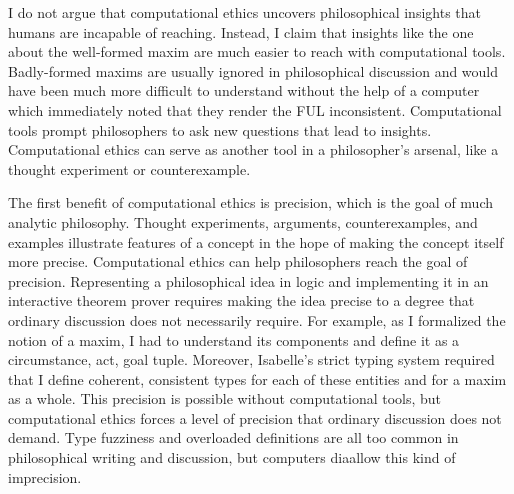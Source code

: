 \begin{isabellebody}
\begin{isamarkuptext}
I do not argue that computational ethics uncovers philosophical insights that humans are incapable 
of reaching. Instead, I claim that insights like the one about the well-formed maxim are much easier
to reach with computational tools. Badly-formed maxims are usually ignored in philosophical discussion 
and would have been much more difficult to understand without the help of a computer which immediately
noted that they render the FUL inconsistent. Computational tools prompt philosophers to ask new questions that 
lead to insights. Computational ethics can serve as another tool in a philosopher's arsenal, like a 
thought experiment or counterexample.

The first benefit of computational ethics is precision, which is the goal of much analytic
philosophy. Thought experiments, arguments, counterexamples, and examples 
illustrate features of a concept in the hope of making the concept itself more precise. Computational 
ethics can help philosophers reach the goal of precision. Representing a philosophical idea in logic 
and implementing it in an interactive theorem prover requires making the idea precise to a degree 
that ordinary discussion does not necessarily require. For example, as I formalized the notion of a 
maxim, I had to understand its components and define it as a circumstance, act, goal tuple. Moreover, 
Isabelle's strict typing system required that I define coherent, consistent types for each of these 
entities and for a maxim as a whole. This precision is possible without computational tools, but 
computational ethics forces a level of precision that ordinary discussion does not demand. Type 
fuzziness and overloaded definitions are all too common in philosophical writing and 
discussion, but computers diaallow this kind of imprecision.


\end{isamarkuptext}
\end{isabellebody}
